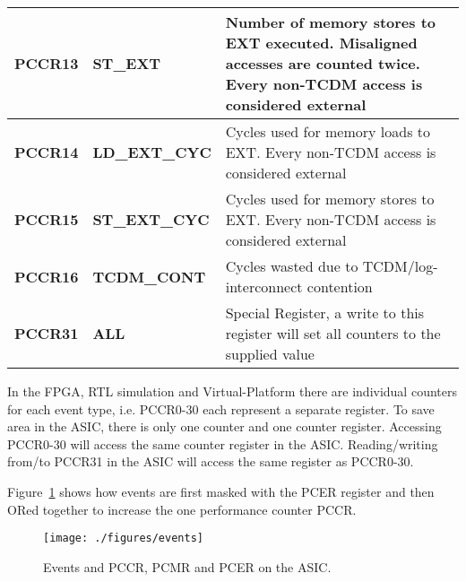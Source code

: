 \begin{table}[H]
\begin{tabularx}{\textwidth}{@{}llX@{}}
  \textbf{PCCR13} & \textbf{ST\_EXT}      & Number of memory stores to EXT executed. Misaligned accesses are counted twice. Every non-TCDM access is considered external \\ \hline
  \textbf{PCCR14} & \textbf{LD\_EXT\_CYC} & Cycles used for memory loads to EXT. Every non-TCDM access is considered external \\ \hline
  \textbf{PCCR15} & \textbf{ST\_EXT\_CYC} & Cycles used for memory stores to EXT. Every non-TCDM access is considered external \\ \hline
  \textbf{PCCR16} & \textbf{TCDM\_CONT}   & Cycles wasted due to TCDM/log-interconnect contention \\ \hline
  \textbf{PCCR31} & \textbf{ALL}          & Special Register, a write to this register will set all counters to the supplied value\\ \bottomrule
\end{tabularx}
\end{table}

In the FPGA, RTL simulation and Virtual-Platform there are individual counters
for each event type, i.e. PCCR0-30 each represent a separate register.
To save area in the ASIC, there is only one counter and one counter register.
Accessing PCCR0-30 will access the same counter register in the ASIC.
Reading/writing from/to PCCR31 in the ASIC will access the same register as
PCCR0-30.

Figure~\ref{fig:events} shows how events are first masked with the PCER register
and then ORed together to increase the one performance counter PCCR.

\begin{figure}[H]
  \centering
  \texttt{[image: ./figures/events]}
  \caption{Events and PCCR, PCMR and PCER on the ASIC.}
  \label{fig:events}
\end{figure}
